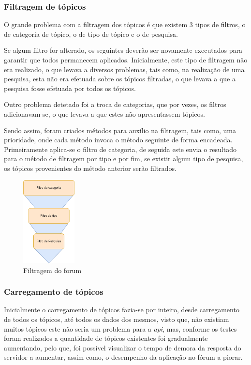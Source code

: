 \subsubsection{Filtragem de tópicos}
O grande problema com a filtragem dos tópicos é que existem 3 tipos de filtros, o de categoria de tópico, o de tipo de tópico e o de pesquisa. 

Se algum filtro for alterado, os seguintes deverão ser novamente executados para garantir que todos permanecem aplicados. Inicialmente, este tipo de filtragem não era realizado, o que levava a diversos problemas, tais como, na realização de uma pesquisa, esta não era efetuada sobre os tópicos filtradas, o que levava a que a pesquisa fosse efetuada por todos os tópicos.

Outro problema detetado foi a troca de categorias, que por vezes, os filtros adicionavam-se, o que levava a que estes não apresentassem tópicos.

Sendo assim, foram criados métodos para auxílio na filtragem, tais como, uma prioridade, onde cada método invoca o método seguinte de forma encadeada. Primeiramente aplica-se o filtro de categoria, de seguida este envia o resultado para o método de filtragem por tipo e por fim, se existir algum tipo de pesquisa, os tópicos provenientes do método anterior serão filtrados.

\begin{figure}[htb]
 \centering
 \includegraphics[width=0.25\textwidth]{images/implementacao/frontend/forum/filtros/filtros.png}
 \caption{Filtragem do forum}
 \label{fig:73}
\end{figure}

\newpage

\subsubsection{Carregamento de tópicos}
Inicialmente o carregamento de tópicos fazia-se por inteiro, desde carregamento de todos os tópicos, até todos os dados dos mesmos, visto que, não existiam muitos tópicos este não seria um problema para a \textit{\acrshort{api}}, mas, conforme os testes foram realizados a quantidade de tópicos existentes foi gradualmente aumentando, pelo que, foi possível visualizar o tempo de demora da resposta do servidor a aumentar, assim como, o desempenho da aplicação no fórum a piorar.

